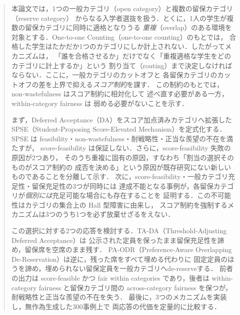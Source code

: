 \documentclass[
    12pt,          %
    a4paper,       %
    oneside,       %
    onecolumn,     %
    titlepage,     %
    final          %
]{jreport} %
\begin{document}

	\begin{abstract}
		本論文では，1つの一般カテゴリ（open category）と複数の留保カテゴリ（reserve category）
		からなる入学者選抜を扱う．とくに，1人の学生が複数の留保カテゴリに同時に適格となりうる
		\emph{重複}（overlap）のある環境を対象とする．One-to-one Counting（one-to-one counting）のもとでは，
		合格した学生はたかだか1つのカテゴリにしか計上されない．したがってメカニズムは，
		「誰を合格させるか」だけでなく「重複適格な学生をどのカテゴリに計上するか」という
		割り当て（routing）まで決定しなければならない．ここに，一般カテゴリのカットオフと
		各留保カテゴリのカットオフの差を上界で抑える\emph{スコア制約}を課す．
		この制約のもとでは，non-wastefulness はスコア制約に相対化して
		述べ直す必要がある一方，within-category fairness は
		弱める必要がないことを示す．

		まず，Deferred Acceptance（DA）をスコア加点済みカテゴリへ拡張した
		SPSE（Student-Proposing Score-Elevated Mechanism）を定式化する．
		SPSE は feasibility・non-wastefulness・耐戦略性・正当な羨望の不在を満たすが，
		score-feasibility は保証しない．さらに，score-feasibility 失敗の原因が2つあり，
		そのうち重複に固有の原因，すなわち「割当の選択そのものがスコア制約の
		成否を決める」という原因が既存研究にない新しいものであることを分離して示す．
		次に，score-feasibility・一般カテゴリ充足性・留保充足性の3つが同時には
		達成不能となる事例が，各留保カテゴリが\emph{個別には}充足可能な場合にも存在することを
		証明する．この不可能性はカテゴリの集合上の Hall 型障害に由来し，
		スコア制約を強制するメカニズムは3つのうち1つを必ず放棄せざるをえない．

		この選択に対する2つの応答を検討する．TA-DA（Threshold-Adjusting Deferred Acceptance）は
		公示された定員を保ったまま留保充足性を諦め，留保席を空席のまま残す．
		PA-ODR（Preference-Aware Overlapping De-Reservation）は逆に，残った席をすべて埋める代わりに
		固定定員のほうを諦め，埋められない留保定員を一般カテゴリへde-reserveする．
		前者の出力は score-feasible かつ fair within categories であり，後者は
		within-category fairness と留保カテゴリ間の across-category fairness を保つが，
		耐戦略性と正当な羨望の不在を失う．
		最後に，3つのメカニズムを実装し，無作為生成した300事例上で
		両応答の代価を定量的に比較する．
	\end{abstract}


	\tableofcontents
	\newpage

\end{document}
